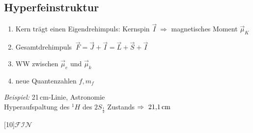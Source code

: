 \subsection{Hyperfeinstruktur}

\begin{enumerate}[$ \Rightarrow $]
	\item Kern trägt einen Eigendrehimpuls: Kernspin $ \vec{I} \ \Rightarrow $ magnetisches Moment $ \vec{\mu}_{K} $
	\item Gesamtdrehimpuls $ \ \vec{F} = \vec{J} + \vec{I} = \vec{L} + \vec{S} + \vec{I} $
	\item WW zwischen $ \vec{\mu}_{e} $ und $ \vec{\mu}_k $
	\item neue Quantenzahlen $ f, m_f $
\end{enumerate}
\emph{Beispiel:} 21\,cm-Linie, Astronomie\\
Hyperaufspaltung des $ ^1 H $ des $ 2 S_{\frac{1}{2}} $ Zustands $ \Rightarrow \ 21{,}1\, \textrm{cm} $
\vspace{100pt}
\begin{center}
	\scalebox{10}[10]{$ \mathcal{FIN} $}
\end{center}